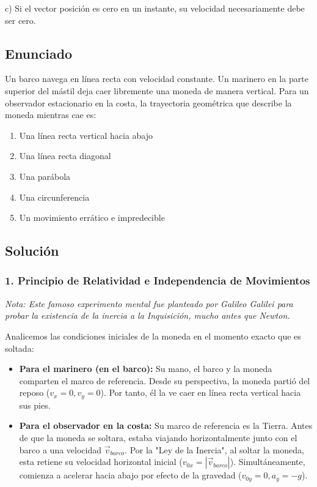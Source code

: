 \documentclass[12pt, a4paper]{article}
\begin{document}
\begin{tcolorbox}[colback=green!5!white, colframe=green!50!black, title=Respuesta Final]
\centering \Large c) Si el vector posición es cero en un instante, su velocidad necesariamente debe ser cero.
\end{tcolorbox}

\newpage

\subsection*{Enunciado}
Un barco navega en línea recta con velocidad constante. Un marinero en la parte superior del mástil deja caer libremente una moneda de manera vertical. Para un observador estacionario en la costa, la trayectoria geométrica que describe la moneda mientras cae es:
\begin{enumerate}[label=\alph*)]
    \item Una línea recta vertical hacia abajo
    \item Una línea recta diagonal
    \item Una parábola
    \item Una circunferencia
    \item Un movimiento errático e impredecible
\end{enumerate}

\subsection*{Solución}

\subsubsection*{1. Principio de Relatividad e Independencia de Movimientos}
\textit{Nota: Este famoso experimento mental fue planteado por Galileo Galilei para probar la existencia de la inercia a la Inquisición, mucho antes que Newton.}

Analicemos las condiciones iniciales de la moneda en el momento exacto que es soltada:
\begin{itemize}
    \item \textbf{Para el marinero (en el barco):} Su mano, el barco y la moneda comparten el marco de referencia. Desde su perspectiva, la moneda partió del reposo ($v_x = 0, v_y = 0$). Por tanto, él la ve caer en línea recta vertical hacia sus pies.
    \item \textbf{Para el observador en la costa:} Su marco de referencia es la Tierra. Antes de que la moneda se soltara, estaba viajando horizontalmente junto con el barco a una velocidad $\vec{v}_{barco}$. Por la "Ley de la Inercia", al soltar la moneda, esta retiene su velocidad horizontal inicial ($v_{0x} = |\vec{v}_{barco}|$). Simultáneamente, comienza a acelerar hacia abajo por efecto de la gravedad ($v_{0y} = 0, a_y = -g$).
\end{itemize}
\end{document}
